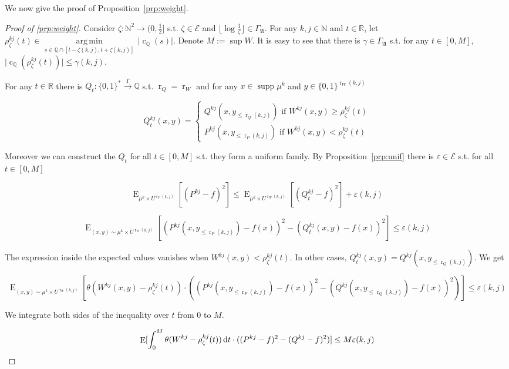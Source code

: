 \documentclass{article}
\numberwithin{equation}{section}
\theoremstyle{definition}
\theoremstyle{plain}
\newcommand{\Words}{{\{ 0, 1 \}^*}}
\newcommand{\WordsLen}[1]{{\{ 0, 1 \}^{#1}}}
\DeclareMathOperator{\Supp}{supp}
\DeclareMathOperator{\E}{E}
\DeclareMathOperator{\R}{r}
\DeclareMathOperator{\En}{c}
\newcommand{\Argmin}[1]{\underset{#1}{\operatorname{arg\,min}}\,}
\newcommand{\Nats}{\mathbb{N}}
\newcommand{\Rats}{\mathbb{Q}}
\newcommand{\Reals}{\mathbb{R}}
\newcommand{\Abs}[1]{\lvert #1 \rvert}
\newcommand{\Floor}[1]{\lfloor #1 \rfloor}
\newcommand{\GrowA}{\Gamma_{\mathfrak{A}}}
\newcommand{\Fall}{\mathcal{E}}
\newcommand{\Scheme}{\xrightarrow{\Gamma}}
\begin{document}
We now give the proof of Proposition~\ref{prp:weight}.

\begin{proof}[Proof of \ref{prp:weight}]

Consider $\zeta: \Nats^2 \rightarrow (0,\frac{1}{2}]$ s.t.  $\zeta \in \Fall$ and $\Floor{\log \frac{1}{\zeta}} \in \GrowA$. For any $k,j \in \Nats$ and $t \in \Reals$, let $\rho_\zeta^{kj}(t) \in \Argmin{s \in \Rats \cap [t-\zeta(k,j),t+\zeta(k,j)]} \Abs{\En_\Rats(s)}$. Denote $M:= \sup W$. It is easy to see that there is $\gamma \in \GrowA$ s.t. for any $t \in [0, M]$, ${\Abs{\En_\Rats(\rho_\zeta^{kj}(t))} \leq \gamma(k,j)}$.

For any $t \in \Reals$ there is $Q_t: \Words \Scheme \Rats$ s.t. $\R_Q=\R_W$ and for any $x \in \Supp \mu^k$ and ${y \in \WordsLen{\R_W(k,j)}}$

$$Q_t^{kj}(x,y)=\begin{cases}Q^{kj}(x,y_{\leq \R_Q(k,j)}) \text{ if } W^{kj}(x,y) \geq \rho^{kj}_\zeta(t) \\ P^{kj}(x,y_{\leq \R_P(k,j)}) \text{ if } W^{kj}(x,y) < \rho^{kj}_\zeta(t)\end{cases}$$

Moreover we can construct the $Q_t$ for all $t \in [0, M]$ s.t. they form a uniform family. By Proposition~\ref{prp:unif} there is $\varepsilon \in \Fall$ s.t. for all $t \in [0, M]$

$$\E_{\mu^k \times U^{\R_P(k,j)}}[(P^{kj}-f)^2] \leq \E_{\mu^k \times U^{\R_W(k,j)}}[(Q_t^{kj}-f)^2] + \varepsilon(k,j)$$

$$\E_{(x,y) \sim \mu^k \times U^{\R_W(k,j)}}[(P^{kj}(x,y_{\leq \R_P(k,j)})-f(x))^2-(Q_t^{kj}(x,y)-f(x))^2] \leq \varepsilon(k,j)$$

The expression inside the expected values vanishes when $W^{kj}(x,y) < \rho^{kj}_\zeta(t)$. In other cases, $Q_t^{kj}(x,y) = Q^{kj}(x,y_{\leq \R_Q(k,j)})$. We get

$$\E_{(x,y) \sim \mu^k \times U^{\R_W(k,j)}}[\theta(W^{kj}(x,y)-\rho_\zeta^{kj}(t)) \cdot ((P^{kj}(x,y_{\leq \R_P(k,j)})-f(x))^2-(Q^{kj}(x,y_{\leq \R_Q(k,j)})-f(x))^2)] \leq \varepsilon(k,j)$$

We integrate both sides of the inequality over $t$ from 0 to $M$.

\begin{equation}
\label{eqn:prp__weight__prf1}
\E[\int_0^M\theta(W^{kj}-\rho_\zeta^{kj}(t)) \dif t \cdot ((P^{kj}-f)^2-(Q^{kj}-f)^2)] \leq M \varepsilon(k,j)
\end{equation}


\end{proof}
\end{document}
